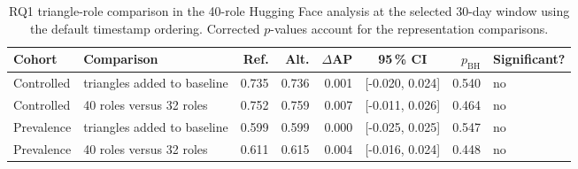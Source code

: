 \begin{table}[ht]
\centering
\caption{RQ1 triangle-role comparison in the 40-role Hugging Face analysis at the selected 30-day window using the default timestamp ordering. Corrected $p$-values account for the representation comparisons.}
\label{tab:res_rq1_triangles}
\footnotesize
\begin{tabular}{@{}l l r r r c r l@{}}
\toprule
\textbf{Cohort} & \textbf{Comparison} & \textbf{Ref.} & \textbf{Alt.} & \textbf{$\Delta$AP} & \textbf{95\,\% CI} & \textbf{$p_{\mathrm{BH}}$} & \textbf{Significant?} \\
\midrule
Controlled & triangles added to baseline & 0.735 & 0.736 & 0.001 & [-0.020, 0.024] & 0.540 & no \\
Controlled & 40 roles versus 32 roles & 0.752 & 0.759 & 0.007 & [-0.011, 0.026] & 0.464 & no \\
Prevalence & triangles added to baseline & 0.599 & 0.599 & 0.000 & [-0.025, 0.025] & 0.547 & no \\
Prevalence & 40 roles versus 32 roles & 0.611 & 0.615 & 0.004 & [-0.016, 0.024] & 0.448 & no \\
\bottomrule
\end{tabular}
\end{table}

